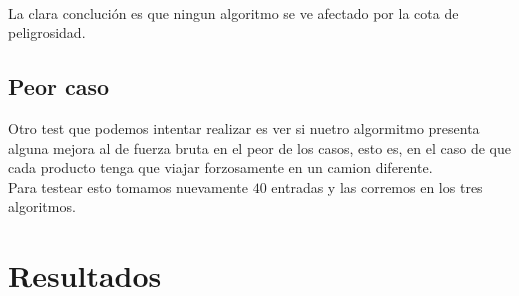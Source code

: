 \\
La clara concluci\'on es que ningun algoritmo se ve afectado por la cota de peligrosidad.

\subsection{Peor caso}
Otro test que podemos intentar realizar es ver si nuetro algormitmo presenta alguna mejora al de fuerza bruta en el peor de los casos, esto es, en el caso de que cada producto tenga que viajar forzosamente en un camion diferente.
\\
Para testear esto tomamos nuevamente $40$ entradas y las corremos en los tres algoritmos.



\newpage
\section{Resultados}